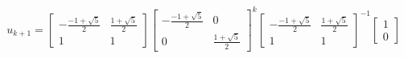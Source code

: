 \documentclass[preview]{standalone}
\begin{document}
\begin{center}
$$u_{k + 1} = \begin{bmatrix} - \frac{-1 + \sqrt{5}}{2} &  \frac{1 + \sqrt{5}}{2} \\ 1 & 1 \end{bmatrix} \begin{bmatrix} - \frac{-1 + \sqrt{5}}{2} &  0 \\ 0 & \frac{1 + \sqrt{5}}{2} \end{bmatrix}^k \begin{bmatrix} - \frac{-1 + \sqrt{5}}{2} &  \frac{1 + \sqrt{5}}{2} \\ 1 & 1 \end{bmatrix}^{-1} \begin{bmatrix} 1 \\ 0 \end{bmatrix}$$
\end{center}
\end{document}
